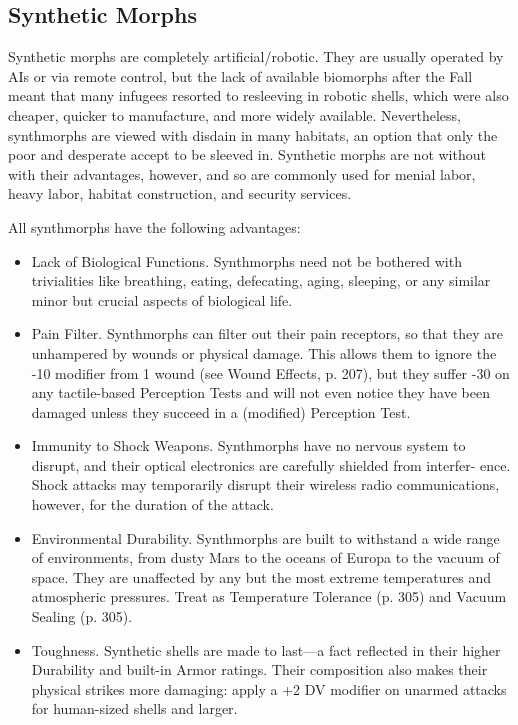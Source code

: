 \subsection{Synthetic Morphs} \label{sec:starting-syntheticmorphs} 

Synthetic morphs are completely artificial/robotic. They are usually operated by AIs or via remote control, but the lack of available biomorphs after the Fall meant that many infugees resorted to resleeving in robotic shells, which were also cheaper, quicker to manufacture, and more widely available. Nevertheless, synthmorphs are viewed with disdain in many habitats, an option that only the poor and desperate accept to be sleeved in. Synthetic morphs are not without with their advantages, however, and so are commonly used for menial labor, heavy labor, habitat construction, and security services. 

All synthmorphs have the following advantages: 

\begin{itemize} \item Lack of Biological Functions. Synthmorphs need not be bothered with trivialities like breathing, eating, defecating, aging, sleeping, or any similar minor but crucial aspects of biological life. \item Pain Filter. Synthmorphs can filter out their pain receptors, so that they are unhampered by wounds or physical damage. This allows them to ignore the -10 modifier from 1 wound (see Wound Effects, p. 207), but they suffer -30 on any tactile-based Perception Tests and will not even notice they have been damaged unless they succeed in a (modified) Perception Test. \item Immunity to Shock Weapons. Synthmorphs have no nervous system to disrupt, and their optical electronics are carefully shielded from interfer- ence. Shock attacks may temporarily disrupt their wireless radio communications, however, for the duration of the attack. \item Environmental Durability. Synthmorphs are built to withstand a wide range of environments, from dusty Mars to the oceans of Europa to the vacuum of space. They are unaffected by any but the most extreme temperatures and atmospheric pressures. Treat as Temperature Tolerance (p. 305) and Vacuum Sealing (p. 305). \item Toughness. Synthetic shells are made to last—a fact reflected in their higher Durability and built-in Armor ratings. Their composition also makes their physical strikes more damaging: apply a +2 DV modifier on unarmed attacks for human-sized shells and larger. \end{itemize} 

